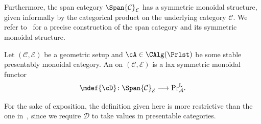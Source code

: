 Furthermore, the span category $\Span{\mathcal C}_{\mathcal E}$ has a symmetric monoidal structure, given informally by the categorical product on the underlying category $\mathcal C$. We refer to~\cites[][Definition 6.1.1]{Liu_Zheng2012}[][Definition~A.5.2 and Remark A.5.5]{Mann2022} for a precise construction of the span category and its symmetric monoidal structure.
\begin{defn}\label{defn:six-func}
  Let $(\mathcal C, \mathcal E)$ be a geometric setup and $\cA\in \CAlg(\Prlst)$ be some stable presentably monoidal category. 
  An  on 
  $(\mathcal C,\mathcal E)$ is a lax symmetric monoidal functor
  \[
    \mdef{\cD}\colon\Span{\mathcal C}_{\mathcal E}\longrightarrow
    \mathrm{Pr}^{\mathrm{L}}_{\mathcal A}.
  \]
\end{defn}
For the sake of exposition, the definition given here is more restrictive than the one in~\cite{Mann2022}, since we require $\mathcal D$ to take values in presentable categories.

\medskip

